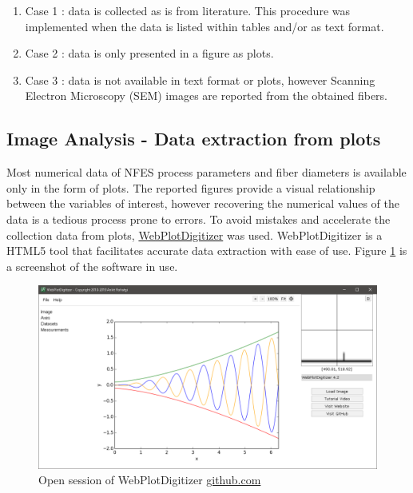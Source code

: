 \begin{enumerate}
\item Case 1 : data is collected as is from literature. This procedure was implemented when the data is listed within tables and/or as text format.
\item Case 2 : data is only presented in a figure as plots.
\item Case 3 : data is not available in text format or plots, however Scanning Electron Microscopy (SEM) images are reported from the obtained fibers.
\end{enumerate}

\subsection{Image Analysis - Data extraction from plots}

Most numerical data of NFES process parameters and fiber diameters is available only in the form of plots. The reported figures provide a visual relationship between the variables of interest, however recovering the numerical values of the data is a tedious process prone to errors. To avoid mistakes and accelerate the collection data from plots, \href{https://github.com/ankitrohatgi/WebPlotDigitizer}{WebPlotDigitizer} was used. WebPlotDigitizer is a HTML5 tool that facilitates accurate data extraction with ease of use. Figure \ref{fig:screenshotWebPlotDigitizer} is a screenshot of the software in use.

\begin{figure}[!th]
\centering
\includegraphics[scale=0.45]{./Figures/screenshotWebPlotDigitizer.png}
\decoRule
\caption[WebPlotDigitizer home-screen]{Open session of WebPlotDigitizer \href{https://github.com/ankitrohatgi/WebPlotDigitizer}{github.com}}
\label{fig:screenshotWebPlotDigitizer}
\end{figure}

